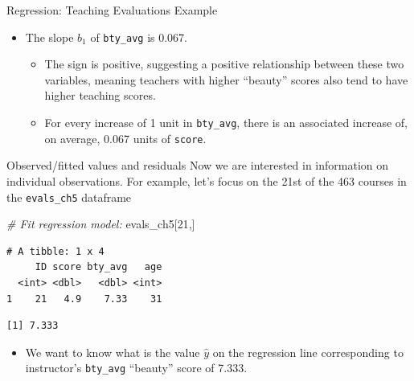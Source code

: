 \documentclass[
  ignorenonframetext,
]{beamer}
\newenvironment{Shaded}{\begin{snugshade}}{\end{snugshade}}
\newcommand{\CommentTok}[1]{\textcolor[rgb]{0.56,0.35,0.01}{\textit{#1}}}
\newcommand{\DecValTok}[1]{\textcolor[rgb]{0.00,0.00,0.81}{#1}}
\newcommand{\NormalTok}[1]{#1}
\newcommand{\SpecialCharTok}[1]{\textcolor[rgb]{0.81,0.36,0.00}{\textbf{#1}}}
\providecommand{\tightlist}{%
  \setlength{\itemsep}{0pt}\setlength{\parskip}{0pt}}
\begin{document}
\begin{frame}[fragile]{Regression: Teaching Evaluations Example}
\protect\hypertarget{regression-teaching-evaluations-example-6}{}
\begin{itemize}
\item
  The slope \(b_1\) of \texttt{bty\_avg} is 0.067.

  \begin{itemize}
  \tightlist
  \item
    The sign is positive, suggesting a positive relationship between
    these two variables, meaning teachers with higher ``beauty'' scores
    also tend to have higher teaching scores.
  \item
    For every increase of 1 unit in \texttt{bty\_avg}, there is an
    associated increase of, on average, 0.067 units of \texttt{score}.
  \end{itemize}
\end{itemize}
\end{frame}

\begin{frame}[fragile]{Observed/fitted values and residuals}
\protect\hypertarget{observedfitted-values-and-residuals}{}
Now we are interested in information on individual observations. For
example, let's focus on the 21st of the 463 courses in the
\texttt{evals\_ch5} dataframe

\small

\begin{Shaded}
\begin{Highlighting}[]
\CommentTok{\# Fit regression model:}
\NormalTok{evals\_ch5[}\DecValTok{21}\NormalTok{,]}
\end{Highlighting}
\end{Shaded}

\begin{verbatim}
# A tibble: 1 x 4
     ID score bty_avg   age
  <int> <dbl>   <dbl> <int>
1    21   4.9    7.33    31
\end{verbatim}

\begin{Shaded}
\end{Shaded}

\begin{verbatim}
[1] 7.333
\end{verbatim}

\normalsize

\begin{itemize}
\tightlist
\item
  We want to know what is the value \(\hat{y}\) on the regression line
  corresponding to instructor's \texttt{bty\_avg} ``beauty'' score of
  7.333.
\end{itemize}
\end{frame}
\end{document}
